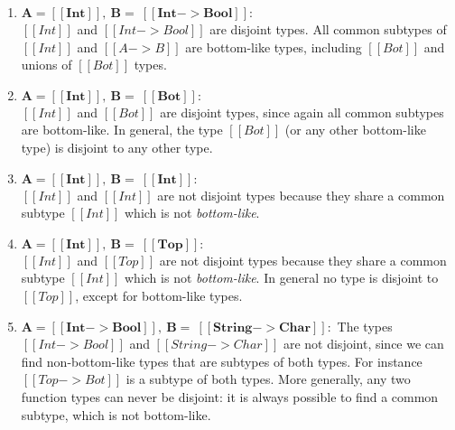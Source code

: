 \begin{enumerate}
  \item $\boldsymbol{A = [[Int]], \ B = \ [[Int -> Bool]]:}$ \\
        $[[Int]]$ and $[[Int -> Bool]]$ are disjoint types. All common subtypes of $[[Int]]$ and $[[A -> B]]$ are bottom-like types,
        including $[[Bot]]$ and unions of $[[Bot]]$ types.
  \item $\boldsymbol{A = [[Int]], \ B = \ [[Bot]]:}$ \\
    $[[Int]]$ and $[[Bot]]$ are disjoint types, since again all common subtypes are bottom-like. In general, the type $[[Bot]]$ (or any other bottom-like type)
    is disjoint to any other type.
  \item $\boldsymbol{A = [[Int]], \ B = \ [[Int]]:}$ \\
        $[[Int]]$ and $[[Int]]$ are not disjoint types because they share a common subtype $[[Int]]$ which
        is not \emph{bottom-like}.
  \item $\boldsymbol{A = [[Int]], \ B = \ [[Top]]:}$ \\
        $[[Int]]$ and $[[Top]]$ are not disjoint types because they share a common
    subtype $[[Int]]$ which is not \emph{bottom-like}. In general no type
    is disjoint to $[[Top]]$, except for bottom-like types.
  \item $\boldsymbol{A = [[Int -> Bool]], \ B = \ [[String -> Char]]:}$
    The types $[[Int -> Bool]]$ and $[[String -> Char]]$ are not disjoint,
    since we can find non-bottom-like types that are subtypes
    of both types. For instance $[[Top -> Bot]]$ is a subtype of both types.
    More generally, any two function types can never be disjoint: it is always
    possible to find a common subtype, which is not bottom-like.
    \\
\end{enumerate}

\begin{comment}
\begin{figure}[t]
  \begin{small}
    \centering
    \drules[ad]{$[[A * B]]$}{Algorithmic Disjointness}{btmr, btml, intl, intr, orl, orr}
  \end{small}
  \caption{Algorithmic Disjointness for \cal.}
  \label{fig:union:ad}
\end{figure}
\end{comment}

